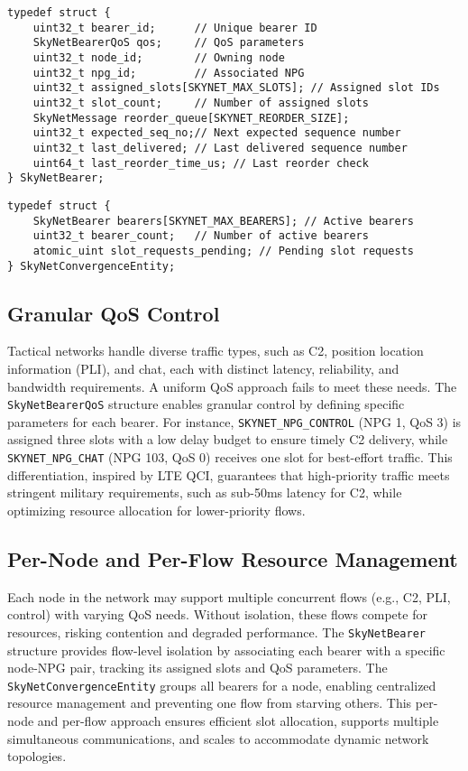 \documentclass{article}
\begin{document}
\begin{lstlisting}
typedef struct {
    uint32_t bearer_id;      // Unique bearer ID
    SkyNetBearerQoS qos;     // QoS parameters
    uint32_t node_id;        // Owning node
    uint32_t npg_id;         // Associated NPG
    uint32_t assigned_slots[SKYNET_MAX_SLOTS]; // Assigned slot IDs
    uint32_t slot_count;     // Number of assigned slots
    SkyNetMessage reorder_queue[SKYNET_REORDER_SIZE];
    uint32_t expected_seq_no;// Next expected sequence number
    uint32_t last_delivered; // Last delivered sequence number
    uint64_t last_reorder_time_us; // Last reorder check
} SkyNetBearer;
\end{lstlisting}

\begin{lstlisting}
typedef struct {
    SkyNetBearer bearers[SKYNET_MAX_BEARERS]; // Active bearers
    uint32_t bearer_count;   // Number of active bearers
    atomic_uint slot_requests_pending; // Pending slot requests
} SkyNetConvergenceEntity;
\end{lstlisting}

\subsection{Granular QoS Control}
Tactical networks handle diverse traffic types, such as C2, position location information (PLI), and
chat, each with distinct latency, reliability, and bandwidth requirements. A uniform QoS approach
fails to meet these needs. The \texttt{SkyNetBearerQoS} structure enables granular control by
defining specific parameters for each bearer. For instance, \texttt{SKYNET\_NPG\_CONTROL} (NPG 1,
QoS 3) is assigned three slots with a low delay budget to ensure timely C2 delivery, while
\texttt{SKYNET\_NPG\_CHAT} (NPG 103, QoS 0) receives one slot for best-effort traffic. This
differentiation, inspired by LTE QCI, guarantees that high-priority traffic meets stringent military
requirements, such as sub-50ms latency for C2, while optimizing resource allocation for
lower-priority flows.

\subsection{Per-Node and Per-Flow Resource Management}
Each node in the network may support multiple concurrent flows (e.g., C2, PLI, control) with varying
QoS needs. Without isolation, these flows compete for resources, risking contention and degraded
performance. The \texttt{SkyNetBearer} structure provides flow-level isolation by associating each
bearer with a specific node-NPG pair, tracking its assigned slots and QoS parameters. The
\texttt{SkyNetConvergenceEntity} groups all bearers for a node, enabling centralized resource
management and preventing one flow from starving others. This per-node and per-flow approach ensures
efficient slot allocation, supports multiple simultaneous communications, and scales to accommodate
dynamic network topologies.
\end{document}
